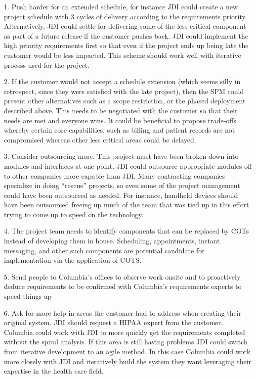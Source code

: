\documentclass[11pt]{article}
\begin{document}
1. Push harder for an extended schedule, for instance JDI could create a new project schedule with 3
cycles of delivery according to the requirements priority. Alternatively, JDI could settle for
delivering some of the less critical component as part of a future release if the customer pushes
back. JDI could implement the high priority requirements first so that even if the project ends up
being late the customer would be less impacted. This scheme should work well with iterative process
used for the project.

2. If the customer would not accept a schedule extension (which seems silly in retrospect, since
they were satisfied with the late project), then the SPM could present other alternatives such as a
scope restriction, or the phased deployment described above. This needs to be negotiated with the
customer so that their needs are met and everyone wins. It could be beneficial to propose trade-offs
whereby certain core capabilities, such as billing and patient records are not compromised whereas
other less critical areas could be delayed.

3. Consider outsourcing more. This project must have been broken down into modules and interfaces at
one point. JDI could outsource appropriate modules off to other companies more capable than
JDI. Many contracting companies specialize in doing “rescue” projects, so even some of the project
management could have been outsourced as needed. For instance, handheld devices should have been
outsourced freeing up much of the team that was tied up in this effort trying to come up to speed on
the technology.

4. The project team needs to identify components that can be replaced by COTs instead of developing
them in house. Scheduling, appointments, instant messaging, and other such components are potential
candidate for implementation via the application of COTS.

5. Send people to Columbia’s offices to observe work onsite and to proactively deduce requirements
to be confirmed with Columbia’s requirements experts to speed things up

6. Ask for more help in areas the customer had to address when creating their original system. JDI
should request a HIPAA expert from the customer. Columbia could work with JDI to more quickly get
the requirements completed without the spiral analysis. If this area is still having problems JDI
could switch from iterative development to an agile method. In this case Columbia could work more
closely with JDI and iteratively build the system they want leveraging their expertise in the health
care field.
\end{document}
